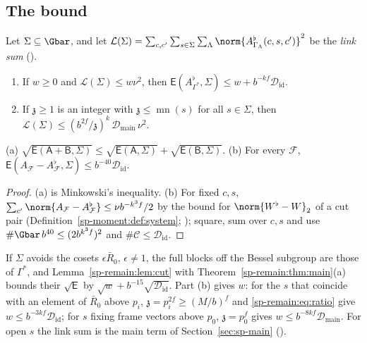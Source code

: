 \subsection{The bound}

\begin{theorem}\label{sp-remain:thm:main}
Let $\Sigma\subseteq\Gbar$, and let $\mathcal L(\Sigma)=\sum_{c,c'}\sum_{s\in\Sigma}\sum_\Lambda
\norm{A^\flat_{\Gamma_\Lambda}(c,s,c')}^2$ be the \emph{link sum} ().
\begin{enumerate}[label=(\alph*)]
\item If $w\ge0$ and $\mathcal L(\Sigma)\le w\nu^2$, then
$\mathsf E(A^\flat_{\Gamma^*},\Sigma)\le w+b^{-kf}\mathcal D_{\mathrm{id}}$.
\item If $\mathfrak z\ge1$ is an integer with $\mathfrak z\le\operatorname{mn}(s)$ for all $s\in\Sigma$, then
$\mathcal L(\Sigma)\le(b^{2f}/\mathfrak z)^k\,\mathcal D_{\mathrm{main}}\,\nu^2$.
\end{enumerate}
\end{theorem}

\begin{lemma}\label{sp-remain:lem:cut}
(a) $\sqrt{\mathsf E(\mathsf A+\mathsf B,\Sigma)}\le\sqrt{\mathsf E(\mathsf A,\Sigma)}+
\sqrt{\mathsf E(\mathsf B,\Sigma)}$. (b) For every $\mathcal F$,
$\mathsf E(A_{\mathcal F}-A^\flat_{\mathcal F},\Sigma)\le b^{-40}\mathcal D_{\mathrm{id}}$.
\end{lemma}

\begin{proof}
(a) is Minkowski's inequality. (b) For fixed $c,s$, $\sum_{c'}\norm{A_{\mathcal F}-
A^\flat_{\mathcal F}}\le\nu b^{-k^3f}/2$ by the bound for $\norm{W^\flat-W}_2$ of a cut pair
(Definition~\ref{sp-moment:def:system}; ); square, sum over $c,s$ and use
$\#\Gbar\,b^{40}\le(2b^{k^3f})^2$ and $\#\mathcal C\le\mathcal D_{\mathrm{id}}$.
\end{proof}

\begin{remark}[Use]\label{sp-remain:rem:use}
If $\Sigma$ avoids the cosets $\epsilon\bar R_0$, $\epsilon\ne1$, the full blocks off the Bessel subgroup
are those of $\Gamma^*$, and Lemma~\ref{sp-remain:lem:cut} with Theorem~\ref{sp-remain:thm:main}(a)
bounds their $\sqrt{\mathsf E}$ by $\sqrt w+b^{-15}\sqrt{\mathcal D_{\mathrm{id}}}$. Part (b) gives $w$: for the $s$ that coincide with an element of $\bar R_0$ above $p_i$, $\mathfrak z=p_i^{2f}\ge(M/b)^f$ and
\eqref{sp-remain:eq:ratio} give $w\le b^{-3kf}\mathcal D_{\mathrm{id}}$; for $s$ fixing frame vectors
above $p_0$, $\mathfrak z=p_0^f$ gives $w\le b^{-8kf}\mathcal D_{\mathrm{main}}$. For open $s$ the link sum is
the main term of Section~\ref{sec:sp-main} ().
\end{remark}

